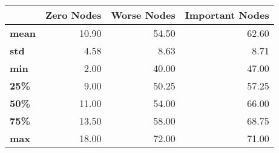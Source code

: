 \begin{tabular}{lrrr}
\toprule
{} &  Zero Nodes &  Worse Nodes &  Important Nodes \\
\midrule
\textbf{mean} &       10.90 &        54.50 &            62.60 \\
\textbf{std } &        4.58 &         8.63 &             8.71 \\
\textbf{min } &        2.00 &        40.00 &            47.00 \\
\textbf{25\% } &        9.00 &        50.25 &            57.25 \\
\textbf{50\% } &       11.00 &        54.00 &            66.00 \\
\textbf{75\% } &       13.50 &        58.00 &            68.75 \\
\textbf{max } &       18.00 &        72.00 &            71.00 \\
\bottomrule
\end{tabular}
